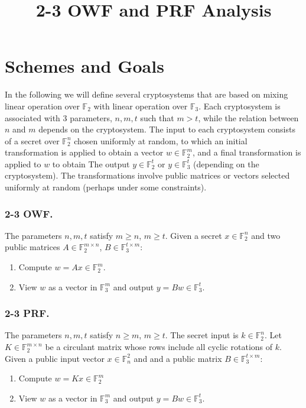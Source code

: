 \documentclass[orivec,envcountsect]{llncs}
\title{2-3 OWF and PRF Analysis}
\author{}
\institute{}
\begin{document}
\maketitle

\section{Schemes and Goals}

In the following we will define several cryptosystems that are based on mixing linear operation over
$\mathbb{F}_2$ with linear operation over $\mathbb{F}_3$.
Each cryptosystem is associated with 3 parameters, $n,m,t$ such that $m > t$,
while the relation between $n$ and $m$ depends on the cryptosystem.
The input to each cryptosystem consists of a secret over $\mathbb{F}_2^n$ chosen uniformly at random,
to which an initial transformation
is applied to obtain a vector $w \in \mathbb{F}_2^m$, and a final transformation is applied to $w$ to obtain
The output $y \in \mathbb{F}_2^t$ or $y\in \mathbb{F}_3^t$ (depending on the cryptosystem).
The transformations involve public matrices or vectors selected uniformly at random
(perhaps under some constraints).


\subsubsection{2-3 OWF.}

The parameters $n,m,t$ satisfy $m \geq n$, $m \geq t$.
Given a secret $x \in \mathbb{F}_2^n$ and
two public matrices $A \in \mathbb{F}_2^{m \times n}$,
$B \in \mathbb{F}_3^{t \times m}$:
\begin{enumerate}
  \item Compute $w = Ax \in \mathbb{F}_2^m$.
  \item View $w$ as a vector in $\mathbb{F}_3^m$ and output $y = Bw \in \mathbb{F}_3^t$.
\end{enumerate}

\subsubsection{2-3 PRF.}

The parameters $n,m,t$ satisfy $n \geq m$, $m \geq t$.
The secret input is $k \in \mathbb{F}_2^{n}$.
Let $K \in \mathbb{F}_2^{m \times n}$ be a circulant matrix 
whose rows include all cyclic rotations of $k$.
Given a public input vector $x \in \mathbb{F}^{2}_n$ and
and a public matrix $B \in \mathbb{F}_3^{t \times m}$:
\begin{enumerate}
  \item Compute $w = Kx \in \mathbb{F}_2^m$
  \item View $w$ as a vector in $\mathbb{F}_3^m$ and output $y = Bw \in \mathbb{F}_3^t$.
\end{enumerate}
\end{document}
